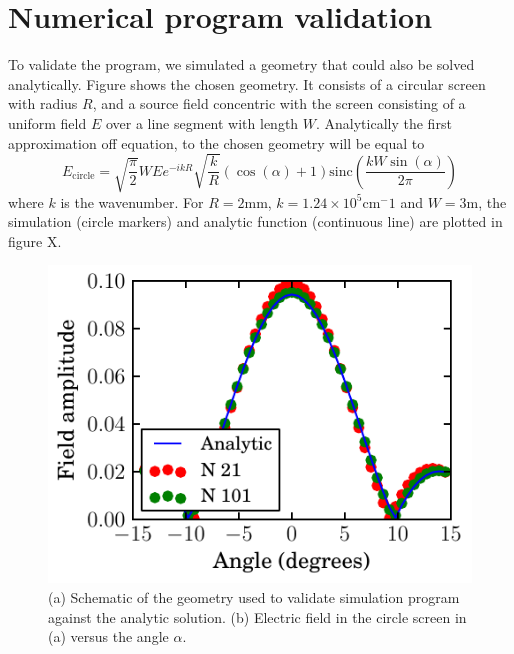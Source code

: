 \documentclass[12pt,twoside,english]{book}
\renewcommand{\~}{\perispomeni}%
\DeclareRobustCommand{\textgreek}[1]{\leavevmode{\greektext #1}}
\numberwithin{equation}{section}
\numberwithin{figure}{section}
\begin{document}
\section{Numerical program validation}
To validate the program, we simulated a geometry that could also be solved analytically. Figure shows the chosen geometry. It consists of a circular screen with radius $R$, and a source field concentric with the screen consisting of a uniform field $E$ over a line segment with length $W$. Analytically the first approximation off equation, to the chosen geometry will be equal to
\begin{equation}
E_{\text{circle}}=\sqrt{\frac{\pi }{2}} W E e^{-i k R} \sqrt{\frac{k}{R}} (\cos (\alpha )+1) \text{sinc}\left(\frac{k W \sin (\alpha )}{2 \pi }\right)
\end{equation}
where $k$ is the wavenumber. For $R=2\text{mm}$, $k=1.24\times10^5\text{cm}^-1$ and $W=3$\textgreek{m}m, the simulation (circle markers) and analytic function (continuous line) are plotted in figure X.
\begin{figure}[h]

\hfill
\includegraphics{compare-analytic.pdf}
\caption{(a) Schematic of the geometry used to validate simulation program against the analytic solution. (b) Electric field in the circle screen in (a) versus the angle $\alpha$.}
\label{fig:program validation}
\end{figure}
%
\end{document}
